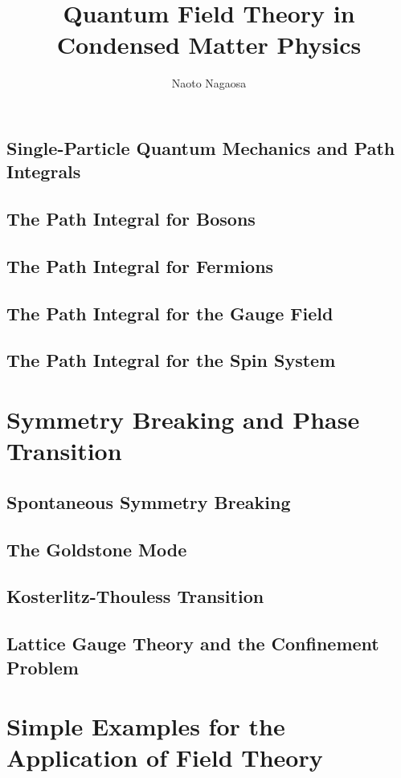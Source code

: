 \documentclass[twoside,11pt]{report}
\title{Quantum Field Theory in Condensed Matter Physics}
\author{Naoto Nagaosa}
\begin{document}
\maketitle
\tableofcontents
\setcounter{page}{0}








\section{Single-Particle Quantum Mechanics and Path Integrals}
\section{The Path Integral for Bosons}
\section{The Path Integral for Fermions}
\section{The Path Integral for the Gauge Field}
\section{The Path Integral for the Spin System}
\chapter{Symmetry Breaking and Phase Transition}
\section{Spontaneous Symmetry Breaking}
\section{The Goldstone Mode}
\section{Kosterlitz-Thouless Transition}
\section{Lattice Gauge Theory and the Confinement Problem}
\chapter{Simple Examples for the Application of Field Theory}
\end{document}
